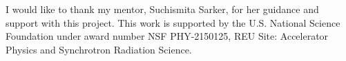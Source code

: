 \documentclass[twocolumn, nofootinbib, secnumarabic, amssymb, nobibnotes, aps, prd]{revtex4-2}
\begin{document}
\clearpage

\onecolumngrid
\begin{acknowledgments}
I would like to thank my mentor, Suchismita Sarker, for her guidance and support with this project. This work is supported by the U.S. National Science Foundation under award number NSF PHY-2150125, REU Site: Accelerator Physics and Synchrotron Radiation Science.
\end{acknowledgments}





\end{document}
